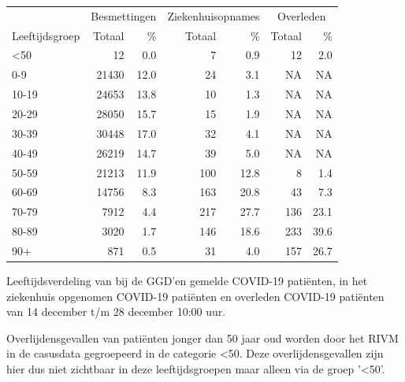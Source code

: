 \documentclass[
  english,
  man,floatsintext]{apa6}
\begin{document}
\begin{table}
\centering\begingroup\fontsize{11}{13}\selectfont

\begin{threeparttable}
\begin{tabular}{lrrrrrr}
\toprule
\multicolumn{1}{c}{ } & \multicolumn{2}{c}{Besmettingen} & \multicolumn{2}{c}{Ziekenhuisopnames} & \multicolumn{2}{c}{Overleden} \\
\cmidrule(l{3pt}r{3pt}){2-3} \cmidrule(l{3pt}r{3pt}){4-5} \cmidrule(l{3pt}r{3pt}){6-7}
Leeftijdsgroep & Totaal & \% & Totaal & \% & Totaal & \%\\
\midrule
<50 & 12 & 0.0 & 7 & 0.9 & 12 & 2.0\\
0-9 & 21430 & 12.0 & 24 & 3.1 & NA & NA\\
10-19 & 24653 & 13.8 & 10 & 1.3 & NA & NA\\
20-29 & 28050 & 15.7 & 15 & 1.9 & NA & NA\\
30-39 & 30448 & 17.0 & 32 & 4.1 & NA & NA\\
40-49 & 26219 & 14.7 & 39 & 5.0 & NA & NA\\
50-59 & 21213 & 11.9 & 100 & 12.8 & 8 & 1.4\\
60-69 & 14756 & 8.3 & 163 & 20.8 & 43 & 7.3\\
70-79 & 7912 & 4.4 & 217 & 27.7 & 136 & 23.1\\
80-89 & 3020 & 1.7 & 146 & 18.6 & 233 & 39.6\\
90+ & 871 & 0.5 & 31 & 4.0 & 157 & 26.7\\
\bottomrule
\end{tabular}
\begin{tablenotes}
\item[1] Leeftijdsverdeling van bij de GGD’en gemelde COVID-19 patiënten, in het ziekenhuis opgenomen COVID-19 patiënten en overleden COVID-19 patiënten van 14 december t/m 28 december 10:00 uur.
\item[2] Overlijdensgevallen van patiënten jonger dan 50 jaar oud worden door het RIVM in de casusdata gegroepeerd in de categorie <50. Deze overlijdensgevallen zijn hier dus niet zichtbaar in deze leeftijdsgroepen maar alleen via de groep '<50'.
\end{tablenotes}
\end{threeparttable}
\endgroup{}
\end{table}

\newpage
\end{document}
